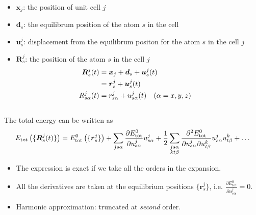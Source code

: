 \begin{frame}
\begin{columns}
    \begin{column}{0.45\textwidth}
      \begin{itemize}
      \item $\boldsymbol{x}_j$: the position of unit cell $j$
      \item $\boldsymbol{d}_s$: the equilibrum position of the atom $s$ in the cell
      \item $\boldsymbol{u}^j_s$: displacement from the equilibrum positon for the atom $s$ in the cell $j$
      \item $\boldsymbol{R}^j_s$: the position of the atom $s$ in the cell $j$
        \begin{align*}
          \boldsymbol{R}^j_s(t) &= \boldsymbol{x}_j + \boldsymbol{d}_s
                                + \boldsymbol{u}^j_s(t) \cr
                                  &= \boldsymbol{r}^j_s + \boldsymbol{u}^j_s(t)  \cr
          {R}_{s\alpha}^j(t) &= {r}_{s\alpha}^j + {u}_{s\alpha}^j(t) 
          \quad (\alpha= x,y,z)
        \end{align*}
      \end{itemize}
    \end{column}
  \end{columns}

  \bigskip
  The total energy can be written as
  \begin{equation*}
    E_{\text{tot}}\left(\{\boldsymbol{R}^j_s(t)\}\right) = 
    E^0_{\text{tot}}\left(\{\boldsymbol{r}^j_s\}\right) +
    \sum_{js\alpha} \frac{
      \partial E^0_{\text{tot}} %
    }{
      \partial {u}_{s\alpha}^j
    } {{u}_{s\alpha}^j} +
    {1\over2} \sum_{\substack{js\alpha \\ kt\beta}}
    \frac{
      \partial^2 E^0_{\text{tot}} %
    }{
      \partial {u}_{s\alpha}^j
      \partial {u}_{t\beta}^k
    } \tikzmark{IFC}
    {{u}_{s\alpha}^j} {{u}_{t\beta}^k}
    + \ldots
  \end{equation*}
  \vspace{-6pt}


  \begin{itemize}
  \item The expression is exact if we take all the orders in the expansion.
  \item All the derivatives are taken at the equilibrium positions
    $\{\boldsymbol{r}^j_s\}$, i.e. $
    \frac{
      \partial E^0_{\text{tot}}
    }{
      \partial
      {u}_{s\alpha}^j
    }=0$. 
  \item Harmonic approximation: truncated at \emph{second} order.
  \end{itemize}
\end{frame}
